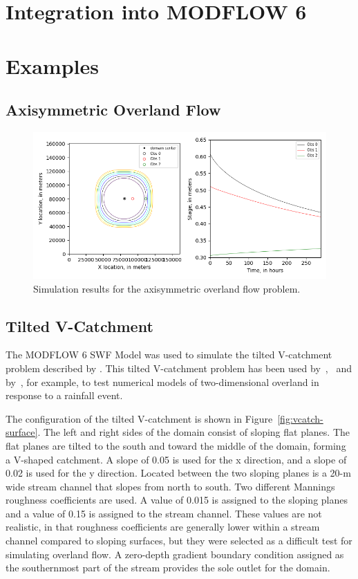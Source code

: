 \documentclass[fleqn]{article}
\begin{document}
\section{Integration into MODFLOW 6}

\section{Examples}

\subsection{Axisymmetric Overland Flow}

\begin{figure}
	\centering
	\includegraphics[scale=0.50]{figures/axi-results.png}
	\caption[Simulation results for the axisymmetric overland flow problem.]{Simulation results for the axisymmetric overland flow problem.}
	\label{fig:axi-results}
\end{figure}


\subsection{Tilted V-Catchment}

The MODFLOW 6 SWF Model was used to simulate the tilted V-catchment problem described by \cite{digiammarco1996}.  This tilted V-catchment problem has been used by~\cite{VanderKwaak1999},~\cite{panday2004} and by~\cite{hughes2015}, for example, to test numerical models of two-dimensional overland in response to a rainfall event.

The configuration of the tilted V-catchment is shown in Figure~\ref{fig:vcatch-surface}.  The left and right sides of the domain consist of sloping flat planes.  The flat planes are tilted to the south and toward the middle of the domain, forming a V-shaped catchment.  A slope of 0.05 is used for the x direction, and a slope of 0.02 is used for the y direction.  Located between the two sloping planes is a 20-m wide stream channel that slopes from north to south.  Two different Mannings roughness coefficients are used.  A value of 0.015 is assigned to the sloping planes and a value of 0.15 is assigned to the stream channel.  These values are not realistic, in that roughness coefficients are generally lower within a stream channel compared to sloping surfaces, but they were selected as a difficult test for simulating overland flow.  A zero-depth gradient boundary condition assigned as the southernmost part of the stream provides the sole outlet for the domain.
\end{document}
